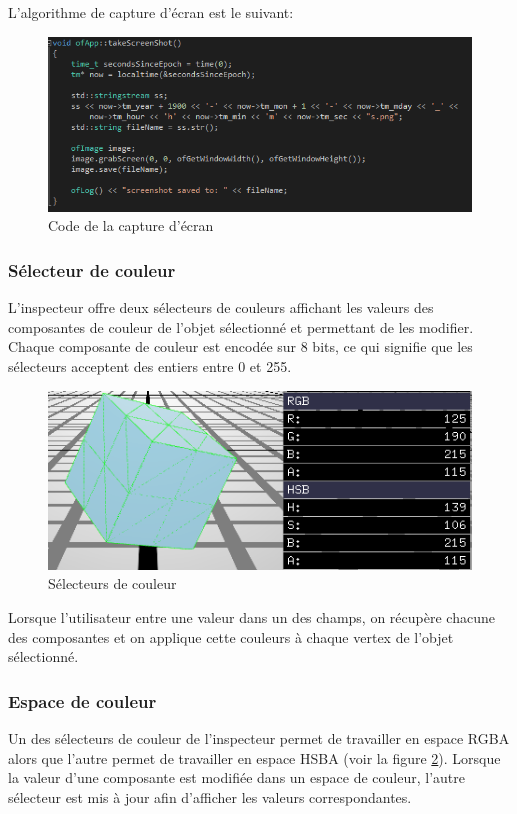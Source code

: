 L'algorithme de capture d'écran est le suivant:
\begin{figure}[H]
    \centering
	\includegraphics[scale=0.5]{fig/screenshotducodequiprenddesscreenshots.PNG}
	\caption{Code de la capture d'écran}
	\label{fig:capture_ecran}
\end{figure}

\subsubsection{Sélecteur de couleur}
\label{ss:selecteur_de_couleur}
L'inspecteur offre deux sélecteurs de couleurs affichant les valeurs des composantes de couleur de l'objet sélectionné et permettant de les modifier.
Chaque composante de couleur est encodée sur 8 bits, ce qui signifie que les sélecteurs acceptent des entiers entre 0 et 255.
\begin{figure}[H]
    \centering
	\includegraphics[scale=0.8]{fig/couleur.PNG}
	\caption{Sélecteurs de couleur}
	\label{fig:color_picker}
\end{figure}
Lorsque l'utilisateur entre une valeur dans un des champs, on récupère chacune des composantes et on applique cette couleurs à chaque vertex de l'objet sélectionné.

\subsubsection{Espace de couleur}
Un des sélecteurs de couleur de l'inspecteur permet de travailler en espace RGBA alors que l'autre permet de travailler en espace HSBA (voir la figure \ref{fig:color_picker}).
Lorsque la valeur d'une composante est modifiée dans un espace de couleur, l'autre sélecteur est mis à jour afin d'afficher les valeurs correspondantes.



